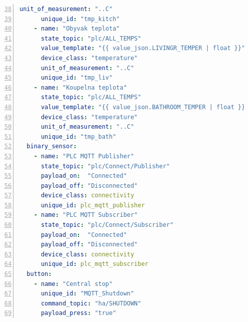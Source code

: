 \begin{lstlisting}[language=YAML, breaklines=true, numbers=left, firstnumber=38, numberstyle=\small, numbersep=10pt, frame=single, basicstyle=\ttfamily\small]
      unit_of_measurement: "..C"                                
      unique_id: "tmp_kitch"                                   
    - name: "Obyvak teplota"                                   
      state_topic: "plc/ALL_TEMPS"                             
      value_template: "{{ value_json.LIVINGR_TEMPER | float }}" 
      device_class: "temperature"                               
      unit_of_measurement: "..C"                               
      unique_id: "tmp_liv"                                     
    - name: "Koupelna teplota"                                 
      state_topic: "plc/ALL_TEMPS"                             
      value_template: "{{ value_json.BATHROOM_TEMPER | float }}"
      device_class: "temperature"                              
      unit_of_measurement: "..C"                               
      unique_id: "tmp_bath"
  binary_sensor:           
    - name: "PLC MQTT Publisher"              
      state_topic: "plc/Connect/Publisher"         
      payload_on:  "Connected"                                 
      payload_off: "Disconnected"   
      device_class: connectivity
      unique_id: plc_mqtt_publisher
    - name: "PLC MQTT Subscriber"
      state_topic: "plc/Connect/Subscriber"                    
      payload_on:  "Connected"                                 
      payload_off: "Disconnected"
      device_class: connectivity
      unique_id: plc_mqtt_subscriber
  button:                                                      
    - name: "Central stop"                                     
      unique_id: "MQTT_Shutdown"                                
      command_topic: "ha/SHUTDOWN"                              
      payload_press: "true" 
\end{lstlisting}
